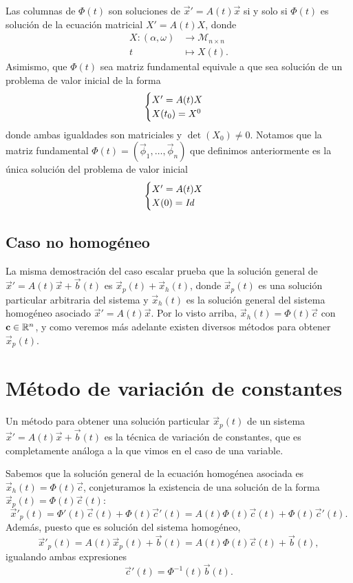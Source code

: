 \documentclass[../ecuaciones_diferenciales.tex]{subfiles}
\begin{document}
Las columnas de \(\Phi(t)\) son soluciones de \(\vec{x}' = A(t)\vec{x}\) si y
solo si \(\Phi(t)\) es solución de la ecuación matricial \(X' = A(t)X\), donde
\begin{align*}
	X : (\alpha, \omega) & \to \mathcal{M}_{n \times n} \\
	t                    & \mapsto X(t).
\end{align*}
Asimismo, que \(\Phi(t)\) sea matriz fundamental equivale a que sea solución de
un problema de valor inicial de la forma
\[\begin{cases}X' = A(t)X \\ X(t_0) = X^0\end{cases}\]
donde ambas igualdades son matriciales y \(\det(X_0) \neq 0\). Notamos que la
matriz fundamental \(\Phi(t) = (\vec{\phi}_1, \dots, \vec{\phi}_n)\) que
definimos anteriormente es la única solución del problema de valor inicial
\[\begin{cases}X' = A(t)X \\ X(0) = \mathit{Id}\end{cases}\]

\subsection{Caso no homogéneo}

La misma demostración del caso escalar prueba que la solución general de
\(\vec{x}' = A(t)\vec{x} + \vec{b}(t)\) es \(\vec{x}_p(t) + \vec{x}_h(t)\),
donde \(\vec{x}_p(t)\) es una solución particular arbitraria del sistema y
\(\vec{x}_h(t)\) es la solución general del sistema homogéneo asociado
\(\vec{x}' = A(t)\vec{x}\). Por lo visto arriba,
\(\vec{x}_h(t) = \Phi(t)\vec{c}\) con \(\mathbf{c} \in \mathbb{R}^n\), y como veremos más
adelante existen diversos métodos para obtener \(\vec{x}_p(t)\).

\section{Método de variación de constantes}

Un método para obtener una solución particular \(\vec{x}_p(t)\) de un sistema
\(\vec{x}' = A(t)\vec{x} + \vec{b}(t)\) es la técnica de variación de
constantes, que es completamente análoga a la que vimos en el caso de una variable.

Sabemos que la solución general de la ecuación homogénea asociada es
\(\vec{x}_h(t) = \Phi(t)\vec{c}\), conjeturamos la existencia
de una solución de la forma \(\vec{x}_p(t) = \Phi(t)\vec{c}(t)\):
\[\vec{x}'_p(t)
	= \Phi'(t) \vec{c}(t) + \Phi(t) \vec{c}'(t)
	= A(t)\Phi(t) \vec{c}(t) + \Phi(t) \vec{c}'(t).\]
Además, puesto que es solución del sistema homogéneo,
\[\vec{x}'_p(t) = A(t)\vec{x}_p(t) + \vec{b}(t)
	= A(t) \Phi(t) \vec{c}(t) + \vec{b}(t),\]
igualando ambas expresiones
\[\vec{c}'(t) = \Phi^{-1}(t) \vec{b}(t).\]
\end{document}
